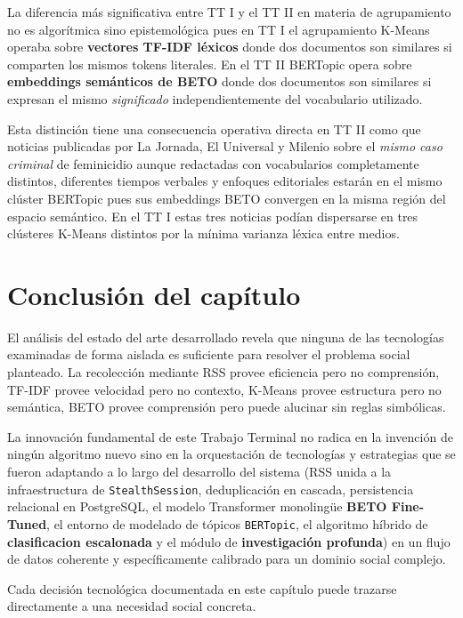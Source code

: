 La diferencia más significativa entre TT I y el TT II en materia de
agrupamiento no es algorítmica sino epistemológica pues en TT I el agrupamiento
K-Means operaba sobre \textbf{vectores TF-IDF léxicos} donde dos documentos son
similares si comparten los mismos tokens literales. En el TT II BERTopic opera sobre
\textbf{embeddings semánticos de BETO} donde dos documentos son similares si
expresan el mismo \textit{significado} independientemente del vocabulario utilizado.

Esta distinción tiene una consecuencia operativa directa en TT II como que noticias
publicadas por La Jornada, El Universal y Milenio sobre el \textit{mismo caso
criminal} de feminicidio aunque redactadas con vocabularios completamente
distintos, diferentes tiempos verbales y enfoques editoriales estarán en el mismo
clúster BERTopic pues sus embeddings BETO convergen en la misma región del espacio
semántico. En el TT I estas tres noticias podían dispersarse en tres clústeres K-Means
distintos por la mínima varianza léxica entre medios.


\section{Conclusión del capítulo}
\label{sec:ea_conclusion}


El análisis del estado del arte desarrollado revela que ninguna de las tecnologías
examinadas de forma aislada es suficiente para resolver el problema social planteado.
La recolección mediante RSS provee eficiencia pero no comprensión, TF-IDF provee velocidad
pero no contexto, K-Means provee estructura pero no semántica, BETO provee comprensión
pero puede alucinar sin reglas simbólicas.

La innovación fundamental de este Trabajo Terminal no radica en la invención de ningún algoritmo
nuevo sino en la orquestación de tecnologías y estrategias que se fueron adaptando a lo largo del
desarrollo del sistema (RSS unida a la infraestructura de \texttt{StealthSession},
deduplicación en cascada, persistencia relacional en PostgreSQL, el modelo Transformer monolingüe
\textbf{BETO Fine-Tuned}, el entorno de modelado de tópicos \texttt{BERTopic},
el algoritmo híbrido de \textbf{clasificacion escalonada} y el módulo de \textbf{investigación profunda})
en un flujo de datos coherente y específicamente calibrado para un dominio social complejo.

Cada decisión tecnológica documentada en este capítulo puede trazarse directamente a una necesidad
social concreta.


